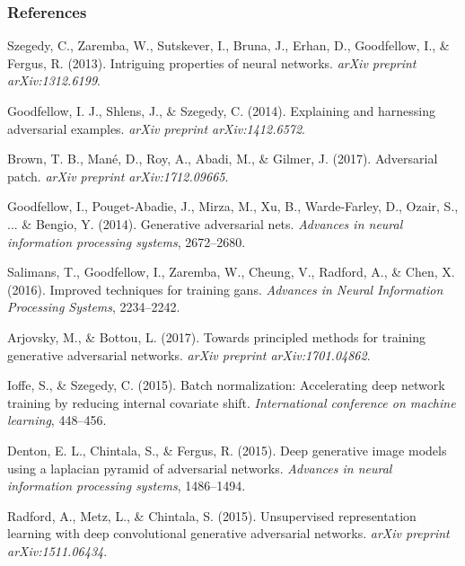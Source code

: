 \documentclass{beamer}
\begin{document}
\begin{frame}[allowframebreaks]
\frametitle{References}
{\footnotesize
\begin{thebibliography}{99} %

 Szegedy, C., Zaremba, W., Sutskever, I., Bruna, J., Erhan, D., Goodfellow, I., \& Fergus, R. (2013).
\newblock Intriguing properties of neural networks.
\newblock \emph{arXiv preprint arXiv:1312.6199}.

 Goodfellow, I. J., Shlens, J., \& Szegedy, C. (2014).
\newblock Explaining and harnessing adversarial examples.
\newblock \emph{arXiv preprint arXiv:1412.6572}.

 Brown, T. B., Mané, D., Roy, A., Abadi, M., \& Gilmer, J. (2017).
\newblock Adversarial patch.
\newblock \emph{arXiv preprint arXiv:1712.09665}.

 Goodfellow, I., Pouget-Abadie, J., Mirza, M., Xu, B., Warde-Farley, D., Ozair, S., ... \& Bengio, Y. (2014).
\newblock Generative adversarial nets.
\newblock \emph{Advances in neural information processing systems}, 2672--2680.

 Salimans, T., Goodfellow, I., Zaremba, W., Cheung, V., Radford, A., \& Chen, X. (2016).
\newblock Improved techniques for training gans.
\newblock \emph{Advances in Neural Information Processing Systems}, 2234--2242.

 Arjovsky, M., \& Bottou, L. (2017).
\newblock Towards principled methods for training generative adversarial networks.
\newblock \emph{arXiv preprint arXiv:1701.04862}.

 Ioffe, S., \& Szegedy, C. (2015).
\newblock Batch normalization: Accelerating deep network training by reducing internal covariate shift.
\newblock \emph{International conference on machine learning}, 448--456.

 Denton, E. L., Chintala, S., \& Fergus, R. (2015).
\newblock Deep generative image models using a laplacian pyramid of adversarial networks.
\newblock \emph{Advances in neural information processing systems}, 1486--1494.

 Radford, A., Metz, L., \& Chintala, S. (2015).
\newblock Unsupervised representation learning with deep convolutional generative adversarial networks.
\newblock \emph{arXiv preprint arXiv:1511.06434}.


\end{thebibliography}}
\end{frame}
\end{document}
